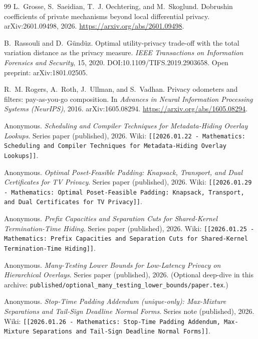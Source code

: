 \documentclass[11pt]{article}
\begin{document}
\begin{thebibliography}{99}
L.~Grosse, S.~Saeidian, T.~J. Oechtering, and M.~Skoglund.
\newblock Dobrushin coefficients of private mechanisms beyond local differential privacy.
\newblock arXiv:2601.09498, 2026. \url{https://arxiv.org/abs/2601.09498}.


B.~Rassouli and D.~G\"und\"uz.
\newblock Optimal utility-privacy trade-off with the total variation distance as the privacy measure.
\newblock \emph{IEEE Transactions on Information Forensics and Security}, 15, 2020.
\newblock DOI:10.1109/TIFS.2019.2903658.
\newblock Open preprint: arXiv:1801.02505.

R.~M. Rogers, A.~Roth, J.~Ullman, and S.~Vadhan.
\newblock Privacy odometers and filters: pay-as-you-go composition.
\newblock In \emph{Advances in Neural Information Processing Systems (NeurIPS)}, 2016.
\newblock arXiv:1605.08294. \url{https://arxiv.org/abs/1605.08294}.

Anonymous.
\newblock \emph{Scheduling and Compiler Techniques for Metadata-Hiding Overlay Lookups}.
\newblock Series paper (published), 2026.
\newblock Wiki: \texttt{[[2026.01.22 - Mathematics: Scheduling and Compiler Techniques for Metadata-Hiding Overlay Lookups]]}.


Anonymous.
\newblock \emph{Optimal Poset-Feasible Padding: Knapsack, Transport, and Dual Certificates for TV Privacy}.
\newblock Series paper (published), 2026.
\newblock Wiki: \texttt{[[2026.01.29 - Mathematics: Optimal Poset-Feasible Padding: Knapsack, Transport, and Dual Certificates for TV Privacy]]}.


Anonymous.
\newblock \emph{Prefix Capacities and Separation Cuts for Shared-Kernel Termination-Time Hiding}.
\newblock Series paper (published), 2026.
\newblock Wiki: \texttt{[[2026.01.25 - Mathematics: Prefix Capacities and Separation Cuts for Shared-Kernel Termination-Time Hiding]]}.


Anonymous.
\newblock \emph{Many-Testing Lower Bounds for Low-Latency Privacy on Hierarchical Overlays}.
\newblock Series paper (published), 2026. (Optional deep-dive in this archive: \texttt{published/optional\_many\_testing\_lower\_bounds/paper.tex}.)


Anonymous.
\newblock \emph{Stop-Time Padding Addendum (unique-only): Max-Mixture Separations and Tail-Sign Deadline Normal Forms}.
\newblock Series note (published), 2026.
\newblock Wiki: \texttt{[[2026.01.26 - Mathematics: Stop-Time Padding Addendum, Max-Mixture Separations and Tail-Sign Deadline Normal Forms]]}.



\end{thebibliography}
\end{document}

